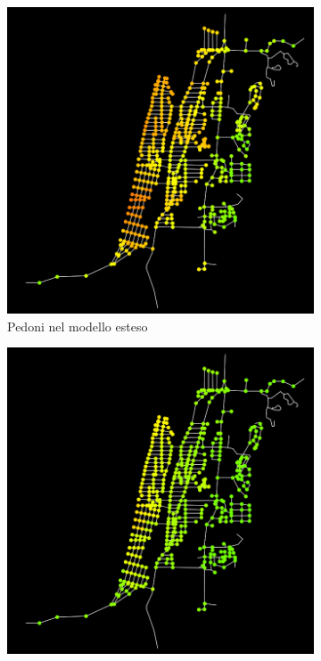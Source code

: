 \begin{figure}[ht]
\begin{subfigure}{0.45\textwidth}
        \includegraphics[width=\textwidth]{images/analisi/comparison-ev-times-map-new-ped.png}
        \caption{Pedoni nel modello esteso}
        \label{fig:2d-evtimes-new-ped}
    \end{subfigure}
    \hfill
    \begin{subfigure}{0.45\textwidth}
        \centering
        \includegraphics[width=\textwidth]{images/analisi/comparison-ev-times-map-base-car.png}

\end{subfigure}
\end{figure}
